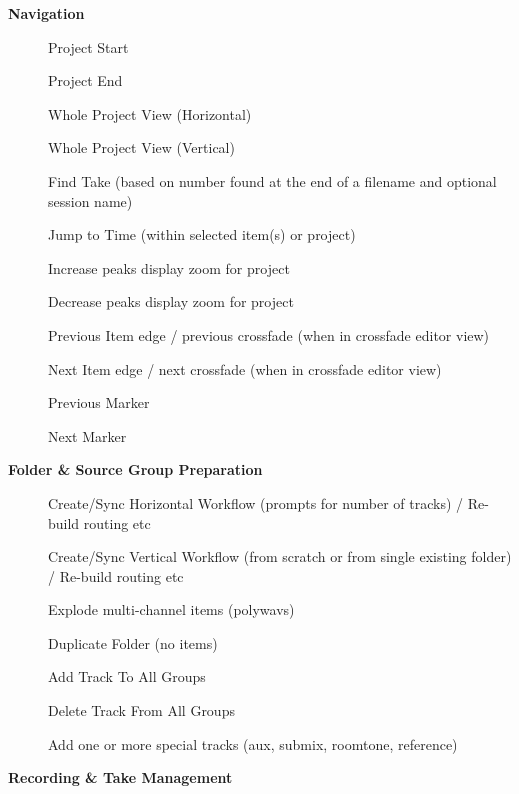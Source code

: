 \documentclass[10pt,american]{article}
\begin{document}
\textbf{Navigation}
\begin{description}
\item [{}] Project Start 
\item [{}] Project End 
\item [{}] Whole Project View (Horizontal)
\item [{}] Whole Project View (Vertical)
\item [{\keys{\return}}] Find Take (based on number found at the end of a
filename and optional session name)
\item [{\keys{\tab}}] Jump to Time (within selected item(s) or project)
\item [{\keys{\ctrl+\arrowkeyup}}] Increase peaks display zoom for project
\item [{\keys{\ctrl+\arrowkeydown}}] Decrease peaks display zoom for project
\item [{}] Previous Item edge / previous crossfade (when in crossfade
editor view)
\item [{}] Next Item edge / next crossfade (when in crossfade editor
view)
\item [{\keys{,}}] Previous Marker 
\item [{}] Next Marker
\end{description}
\textbf{Folder \& Source Group Preparation}
\begin{description}
\item [{}] Create/Sync Horizontal Workflow (prompts for number of
tracks) / Re-build routing etc
\item [{}] Create/Sync Vertical Workflow (from scratch or from single
existing folder) / Re-build routing etc
\item [{}] Explode multi-channel items (polywavs)
\item [{\keys{\textbackslash}}] Duplicate Folder (no items)
\item [{}] Add Track To All Groups
\item [{\keys{\ctrl+\shift+\del}}] Delete Track From All Groups
\item [{\keys{\#}}] Add one or more special tracks (aux, submix, roomtone,
reference)
\end{description}
\textbf{Recording \& Take Management}
\end{document}
